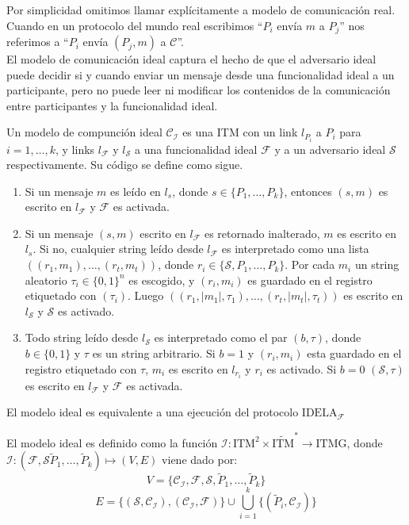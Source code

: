 Por simplicidad omitimos llamar explícitamente a modelo de comunicación real.
Cuando en un protocolo del mundo real escribimos ``$P_i$ envía $m$ a $P_j$''
nos referimos a ``$P_i$ envía $(P_j, m)$ a $\mathcal{C}$''.\\
El modelo de comunicación ideal captura el hecho de que el adversario ideal puede
decidir si y cuando enviar un mensaje desde una funcionalidad ideal a un participante,
pero no puede leer ni modificar los contenidos de la comunicación entre participantes
y la funcionalidad ideal.

\begin{definicion}
Un modelo de compunción ideal $\mathcal{C_I}$ es una ITM con un link $l_{P_i}$ a 
$P_i$ para $i = 1, \ldots, k$,
y links $l_\mathcal{F}$ y $l_\mathcal{S}$ a una funcionalidad ideal $\mathcal{F}$
y a un adversario ideal $\mathcal{S}$ respectivamente. Su código se define como sigue.
\begin{enumerate}
  \item Si un mensaje $m$ es leído en $l_s$, donde $s \in \{P_1, \ldots, P_k\}$,
        entonces $(s, m)$ es escrito en $l_\mathcal{F}$ y $\mathcal{F}$ es activada.
  \item Si un mensaje $(s, m)$ escrito en $l_\mathcal{F}$ es retornado inalterado, $m$ es
        escrito en $l_s$. Si no, cualquier string leído desde $l_\mathcal{F}$ es interpretado
        como una lista $((r_1, m_1), \ldots, (r_t, m_t))$, donde $r_i \in \{\mathcal{S},
        P_1, \ldots, P_k\}$. Por cada $m_i$ un string aleatorio $\tau_i \in \{0, 1\}^n$ es
        escogido, y $(r_i, m_i)$ es guardado en el registro etiquetado con $(\tau_i)$. Luego
        $((r_1, |m_1|, \tau_1), \ldots, (r_t, |m_t|, \tau_t))$ es
        escrito en $l_\mathcal{S}$ y $\mathcal{S}$ es activado.
  \item Todo string leído desde $l_\mathcal{S}$ es interpretado como el par $(b, \tau)$, donde
        $b \in \{0, 1\}$ y $\tau$ es un string arbitrario. Si $b = 1$ y $(r_i, m_i)$
        esta guardado en el registro etiquetado con $\tau$, $m_i$ es escrito en $l_{r_i}$
        y $r_i$ es activado. Si $b = 0$ $(\mathcal{S}, \tau)$ es escrito en
        $l_\mathcal{F}$ y $\mathcal{F}$ es activada.
\end{enumerate}
\end{definicion}

El modelo ideal es equivalente a una ejecución del protocolo $\textrm{IDELA}_{\mathcal{F}}$

\begin{definicion}
El modelo ideal es definido como la función $\mathcal{I}:\textrm{ITM}^2 \times
\tilde{\textrm{ITM}}^* \to \textrm{ITMG}$, donde $\mathcal{I}: (\mathcal{F}, \mathcal{S}
\tilde{P}_1, \ldots, \tilde{P}_k) \mapsto (V, E)$ viene dado por:
$$V = \{\mathcal{C_I}, \mathcal{F}, \mathcal{S}, \tilde{P}_1, \ldots, \tilde{P}_k\}$$
$$E = \{(\mathcal{S}, \mathcal{C_I}), (\mathcal{C_I}, \mathcal{F})\} \cup
\bigcup_{i = 1}^{k}\{(\tilde{P}_i, \mathcal{C_I})\}$$
\end{definicion}


